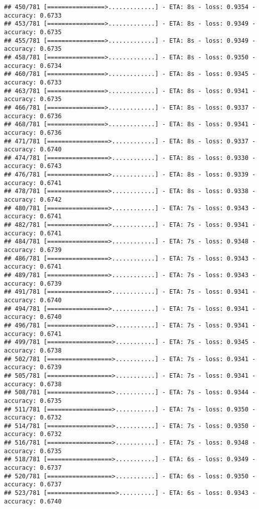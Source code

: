 \documentclass[
]{article}
\begin{document}
\begin{verbatim}
## 450/781 [================>.............] - ETA: 8s - loss: 0.9354 - accuracy: 0.6733
## 453/781 [================>.............] - ETA: 8s - loss: 0.9349 - accuracy: 0.6735
## 455/781 [================>.............] - ETA: 8s - loss: 0.9349 - accuracy: 0.6735
## 458/781 [================>.............] - ETA: 8s - loss: 0.9350 - accuracy: 0.6734
## 460/781 [================>.............] - ETA: 8s - loss: 0.9345 - accuracy: 0.6733
## 463/781 [================>.............] - ETA: 8s - loss: 0.9341 - accuracy: 0.6735
## 466/781 [================>.............] - ETA: 8s - loss: 0.9337 - accuracy: 0.6736
## 468/781 [================>.............] - ETA: 8s - loss: 0.9341 - accuracy: 0.6736
## 471/781 [=================>............] - ETA: 8s - loss: 0.9337 - accuracy: 0.6740
## 474/781 [=================>............] - ETA: 8s - loss: 0.9330 - accuracy: 0.6743
## 476/781 [=================>............] - ETA: 8s - loss: 0.9339 - accuracy: 0.6741
## 478/781 [=================>............] - ETA: 8s - loss: 0.9338 - accuracy: 0.6742
## 480/781 [=================>............] - ETA: 7s - loss: 0.9343 - accuracy: 0.6741
## 482/781 [=================>............] - ETA: 7s - loss: 0.9341 - accuracy: 0.6741
## 484/781 [=================>............] - ETA: 7s - loss: 0.9348 - accuracy: 0.6739
## 486/781 [=================>............] - ETA: 7s - loss: 0.9343 - accuracy: 0.6741
## 489/781 [=================>............] - ETA: 7s - loss: 0.9343 - accuracy: 0.6739
## 491/781 [=================>............] - ETA: 7s - loss: 0.9341 - accuracy: 0.6740
## 494/781 [=================>............] - ETA: 7s - loss: 0.9341 - accuracy: 0.6740
## 496/781 [==================>...........] - ETA: 7s - loss: 0.9341 - accuracy: 0.6741
## 499/781 [==================>...........] - ETA: 7s - loss: 0.9345 - accuracy: 0.6738
## 502/781 [==================>...........] - ETA: 7s - loss: 0.9341 - accuracy: 0.6739
## 505/781 [==================>...........] - ETA: 7s - loss: 0.9341 - accuracy: 0.6738
## 508/781 [==================>...........] - ETA: 7s - loss: 0.9344 - accuracy: 0.6735
## 511/781 [==================>...........] - ETA: 7s - loss: 0.9350 - accuracy: 0.6732
## 514/781 [==================>...........] - ETA: 7s - loss: 0.9350 - accuracy: 0.6732
## 516/781 [==================>...........] - ETA: 7s - loss: 0.9348 - accuracy: 0.6735
## 518/781 [==================>...........] - ETA: 6s - loss: 0.9349 - accuracy: 0.6737
## 520/781 [==================>...........] - ETA: 6s - loss: 0.9350 - accuracy: 0.6737
## 523/781 [===================>..........] - ETA: 6s - loss: 0.9343 - accuracy: 0.6740

\end{verbatim}
\end{document}

